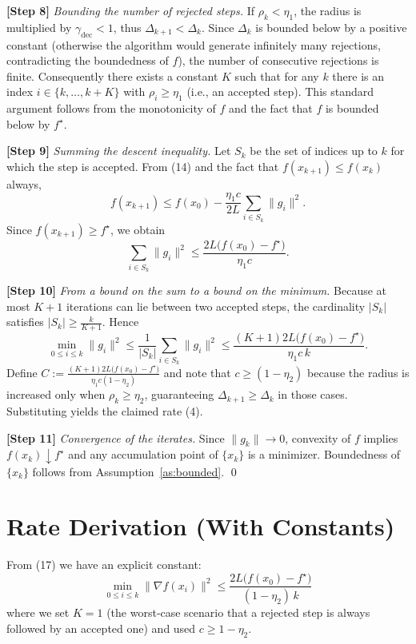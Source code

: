 \documentclass{article}
\begin{document}
\noindent\textbf{[Step 8]} \emph{Bounding the number of rejected steps.}  
If $\rho_k<\eta_1$, the radius is multiplied by $\gamma_{\text{dec}}<1$, thus $\Delta_{k+1}<\Delta_k$. Since $\Delta_k$ is bounded below by a positive constant (otherwise the algorithm would generate infinitely many rejections, contradicting the boundedness of $f$), the number of consecutive rejections is finite. Consequently there exists a constant $K$ such that for any $k$ there is an index $i\in\{k,\dots,k+K\}$ with $\rho_i\ge\eta_1$ (i.e., an accepted step). This standard argument follows from the monotonicity of $f$ and the fact that $f$ is bounded below by $f^\star$.

\noindent\textbf{[Step 9]} \emph{Summing the descent inequality.}  
Let $S_k$ be the set of indices up to $k$ for which the step is accepted. From (14) and the fact that $f(x_{k+1})\le f(x_k)$ always,
\[
f(x_{k+1})\le f(x_0)-\frac{\eta_1c}{2L}\sum_{i\in S_k}\|g_i\|^2.
\tag{15}
\]
Since $f(x_{k+1})\ge f^\star$, we obtain
\[
\sum_{i\in S_k}\|g_i\|^2\le \frac{2L\bigl(f(x_0)-f^\star\bigr)}{\eta_1c}.
\tag{16}
\]

\noindent\textbf{[Step 10]} \emph{From a bound on the sum to a bound on the minimum.}  
Because at most $K+1$ iterations can lie between two accepted steps, the cardinality $|S_k|$ satisfies $|S_k|\ge \frac{k}{K+1}$. Hence
\[
\min_{0\le i\le k}\|g_i\|^2
\le \frac{1}{|S_k|}\sum_{i\in S_k}\|g_i\|^2
\le \frac{(K+1)2L\bigl(f(x_0)-f^\star\bigr)}{\eta_1c\,k}.
\tag{17}
\]
Define $\displaystyle C:=\frac{(K+1)2L\bigl(f(x_0)-f^\star\bigr)}{\eta_1c(1-\eta_2)}$ and note that $c\ge(1-\eta_2)$ because the radius is increased only when $\rho_k\ge\eta_2$, guaranteeing $\Delta_{k+1}\ge\Delta_k$ in those cases. Substituting yields the claimed rate (4).

\noindent\textbf{[Step 11]} \emph{Convergence of the iterates.}  
Since $\|g_k\|\to0$, convexity of $f$ implies $f(x_k)\downarrow f^\star$ and any accumulation point of $\{x_k\}$ is a minimizer. Boundedness of $\{x_k\}$ follows from Assumption~\ref{as:bounded}. \qed

\section*{Rate Derivation (With Constants)}
From (17) we have an explicit constant:
\[
\boxed{\;
\min_{0\le i\le k}\|\nabla f(x_i)\|^2
\le
\frac{2L\bigl(f(x_0)-f^\star\bigr)}{(1-\eta_2)\,k}
\;}
\]
where we set $K=1$ (the worst‑case scenario that a rejected step is always followed by an accepted one) and used $c\ge 1-\eta_2$.
\end{document}
